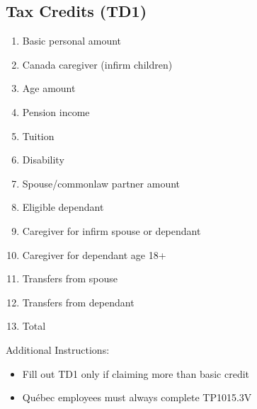 \documentclass[letterpaper,10pt,english]{sphinxmanual}
\begin{document}
\subsection{Tax Credits (TD1)}
\label{\detokenize{onboarding_employee:tax-credits-td1}}\begin{enumerate}
%
\item {} 
\sphinxAtStartPar
Basic personal amount

\item {} 
\sphinxAtStartPar
Canada caregiver (infirm children)

\item {} 
\sphinxAtStartPar
Age amount

\item {} 
\sphinxAtStartPar
Pension income

\item {} 
\sphinxAtStartPar
Tuition

\item {} 
\sphinxAtStartPar
Disability

\item {} 
\sphinxAtStartPar
Spouse/common\sphinxhyphen{}law partner amount

\item {} 
\sphinxAtStartPar
Eligible dependant

\item {} 
\sphinxAtStartPar
Caregiver for infirm spouse or dependant

\item {} 
\sphinxAtStartPar
Caregiver for dependant age 18+

\item {} 
\sphinxAtStartPar
Transfers from spouse

\item {} 
\sphinxAtStartPar
Transfers from dependant

\item {} 
\sphinxAtStartPar
Total

\end{enumerate}

\sphinxAtStartPar
Additional Instructions:
\begin{itemize}
\item {} 
\sphinxAtStartPar
Fill out TD1 only if claiming more than basic credit

\item {} 
\sphinxAtStartPar
Québec employees must always complete TP\sphinxhyphen{}1015.3\sphinxhyphen{}V

\end{itemize}
\end{document}
